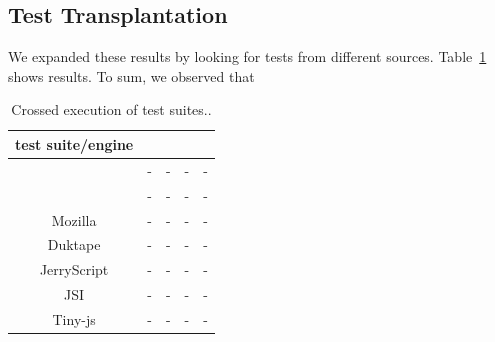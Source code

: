 \documentclass[10pt,conference,anonymous]{IEEEtran}
\begin{document}
\subsection{Test Transplantation}

We expanded these results by looking for tests from different
sources.  Table~\ref{tab:cross-testing} shows
results. To sum, we observed that 

\begin{table}[h]
  \centering
  \caption{\label{tab:cross-testing}Crossed execution of test suites..}
  \begin{tabular}{crrrr}
    \toprule
    test suite/engine & \jsc{} & \veight{} & \chakra{} & \smonkey{} \\
    \midrule
    \jsc{} & - & - & - & -  \\
    \veight{} & - & - & - & -  \\
    Mozilla & - & - & - & -  \\
    Duktape & - & - & - & -  \\
    JerryScript & - & - & - & -  \\
    JSI & - & - & - & -  \\
    Tiny-js & - & - & - & -  \\
    \bottomrule 
  \end{tabular}
\end{table}  

\end{document}
